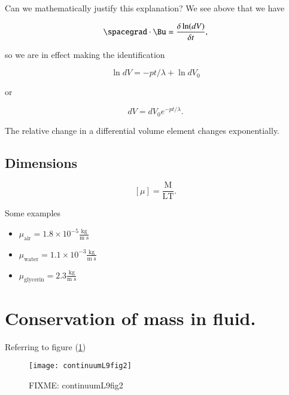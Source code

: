 Can we mathematically justify this explanation?  We see above that we have

\begin{equation}\label{eqn:continuumL9:650}
\spacegrad \cdot \Bu = \frac{\delta \ln(dV)}{\delta t},
\end{equation}

so we are in effect making the identification

\begin{equation}\label{eqn:continuumL9:670}
\ln dV = -p t /\lambda + \ln dV_0
\end{equation}

or

\begin{equation}\label{eqn:continuumL9:690}
dV = dV_0 e^{-p t/\lambda}.
\end{equation}

The relative change in a differential volume element changes exponentially.

\subsection{Dimensions}

\begin{equation}\label{eqn:continuumL9:290}
[\mu] = \frac{\text{M}}{\text{L}\text{T}}.
\end{equation}

Some examples

\begin{itemize}
\item $\mu_{\text{air}} = 1.8 \times 10^{-5} \frac{\text{kg}}{\text{m s}}$
\item $\mu_{\text{water}} = 1.1 \times 10^{-3} \frac{\text{kg}}{\text{m s}}$
\item $\mu_{\text{glycerin}} = 2.3 \frac{\text{kg}}{\text{m s}}$
\end{itemize}

\section{Conservation of mass in fluid.}

Referring to figure (\ref{fig:continuumL9:continuumL9fig2})
\begin{figure}[htp]
   \centering
   \texttt{[image: continuumL9fig2]}
   \caption{FIXME: continuumL9fig2}\label{fig:continuumL9:continuumL9fig2}
\end{figure}

